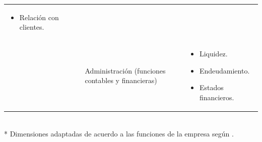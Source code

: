 \begin{table}
\begin{tabular}{|p{3cm}|p{4cm}|p{3.5cm}|p{3.5cm}|p{5cm}|}
\begin{itemize}[noitemsep]
       \item Relación con clientes.
     \end{itemize} \\ \cline{4-5}
     &  &  & Administración (funciones contables y financieras) &
     \begin{itemize}[noitemsep]
       \item Liquidez.
       \item Endeudamiento.
       \item Estados financieros.
     \end{itemize} \\ \hline
    \end{tabular}
    \\
    * Dimensiones adaptadas de acuerdo a las funciones de la empresa según \cite{fayol}.
\end{table}

\newpage

